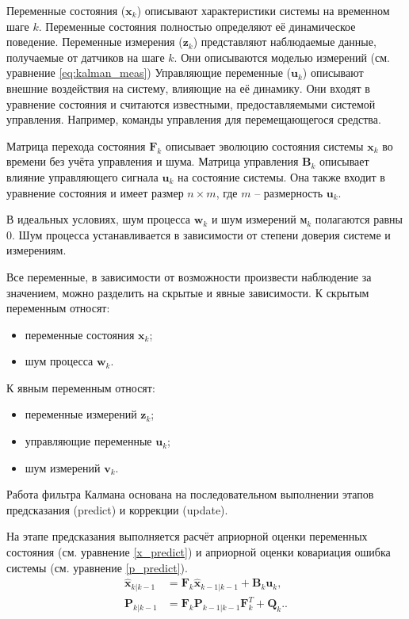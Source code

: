 {Переменные состояния (\(\mathbf{x}_k\)) описывают характеристики системы на временном шаге \( k \).
Переменные состояния полностью определяют её динамическое поведение.
Переменные измерения (\(\mathbf{z}_k\)) представляют наблюдаемые данные, получаемые от датчиков на шаге \( k \). 
Они описываются моделью измерений (см. уравнение \ref{eq:kalman_meas})
Управляющие переменные (\(\mathbf{u}_k\)) описывают внешние воздействия на систему, влияющие на её динамику.
Они входят в уравнение состояния и считаются известными, предоставляемыми системой управления.
Например, команды управления для перемещающегося средства.

Матрица перехода состояния \(\mathbf{F}_k\) описывает эволюцию состояния системы \(\mathbf{x}_k\) во времени без учёта управления и шума.
Матрица управления \(\mathbf{B}_k\) описывает влияние управляющего сигнала \(\mathbf{u}_k\) на состояние системы. Она также входит в уравнение состояния и имеет размер \(n \times m\), где \(m\) -- размерность \(\mathbf{u}_k\).

В идеальных условиях, шум процесса \(\mathbf{w}_k\) и шум измерений \(\mathbf{м}_k\)
полагаются равны 0. Шум процесса устанавливается в зависимости от степени
доверия системе и измерениям.

Все переменные, в зависимости от возможности произвести наблюдение за значением,
можно разделить на скрытые и явные зависимости.
К скрытым переменным относят:
\begin{itemize}
    \item переменные состояния $\mathbf{x}_k$; 
    \item шум процесса $\mathbf{w}_k$.
\end{itemize}

К явным переменным относят:
\begin{itemize}
    \item переменные измерений $\mathbf{z}_k$; 
    \item управляющие переменные $\mathbf{u}_k$; 
    \item шум измерений $\mathbf{v}_k$.
\end{itemize}

Работа фильтра Калмана основана на последовательном выполнении этапов предсказания (predict) и 
коррекции (update).

На этапе предсказания выполняется расчёт 
априорной оценки переменных состояния (см. уравнение \ref{x_predict})
и априорной оценки ковариация ошибка системы (см. уравнение \ref{p_predict}).
\begin{align}
\hat{\mathbf{x}}_{k|k-1} &= \mathbf{F}_k \hat{\mathbf{x}}_{k-1|k-1} + \mathbf{B}_k \mathbf{u}_k, \label{x_predict}\\
\mathbf{P}_{k|k-1} &= \mathbf{F}_k \mathbf{P}_{k-1|k-1} \mathbf{F}_k^T + \mathbf{Q}_k. \label{p_predict}.
\end{align}

}
